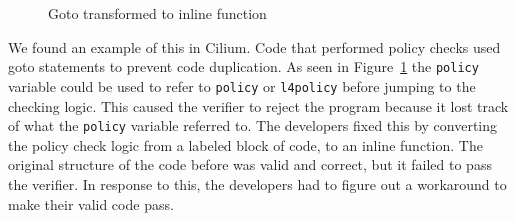 \begin{figure}
    
    \caption{Goto transformed to inline function}
    \label{fig:inline-fig}
\end{figure}

%
%

We found an example of this in Cilium.
Code that performed policy checks used goto statements to prevent code duplication.
As seen in Figure~\ref{fig:inline-fig} the \texttt{policy} variable could be used to refer to \texttt{policy} or \texttt{l4policy} before jumping to the checking logic.
This caused the verifier to reject the program because it lost track of what the \texttt{policy} variable referred to.
The developers fixed this by converting the policy check logic from a labeled block of code, to an inline function.
The original structure of the code before was valid and correct, but it failed to pass the verifier.
In response to this, the developers had to figure out a workaround to make their valid code pass.



